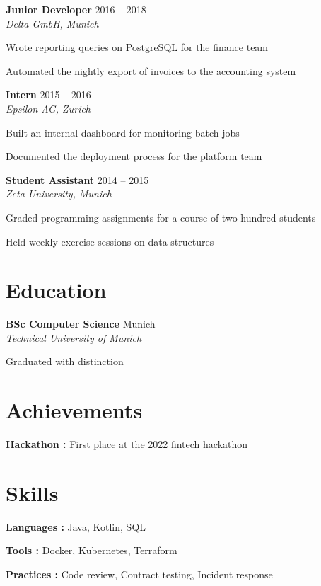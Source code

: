 \documentclass[10pt]{extarticle}
\newcommand{\role}[3]{%
  \textbf{#1} \hfill {\color{soft}\small #3}\\[-1pt]
  {\itshape\small #2}\par
}
\newcommand{\edu}[3]{%
  \textbf{#1} \hfill {\color{soft}\small #3}\\[-1pt]
  {\itshape\small #2}\par
}
\begin{document}
\role{Junior Developer}{Delta GmbH, Munich}{2016 – 2018}

\begin{tightlist}
    \item Wrote reporting queries on PostgreSQL for the finance team

    \item Automated the nightly export of invoices to the accounting system

\end{tightlist}

\role{Intern}{Epsilon AG, Zurich}{2015 – 2016}

\begin{tightlist}
    \item Built an internal dashboard for monitoring batch jobs

    \item Documented the deployment process for the platform team

\end{tightlist}

\role{Student Assistant}{Zeta University, Munich}{2014 – 2015}

\begin{tightlist}
    \item Graded programming assignments for a course of two hundred students

    \item Held weekly exercise sessions on data structures

\end{tightlist}

\section{Education}

\edu{BSc Computer Science}{Technical University of Munich}{Munich}

{\footnotesize Graduated with distinction}

\section{Achievements}

\begin{tightlist}
\item \textbf{Hackathon :} First place at the 2022 fintech hackathon
\end{tightlist}

\section{Skills}

\begin{tightlist}
    \item[] \textbf{Languages :} Java, Kotlin, SQL

    \item[] \textbf{Tools :} Docker, Kubernetes, Terraform

    \item[] \textbf{Practices :} Code review, Contract testing, Incident response

\end{tightlist}
\end{document}
